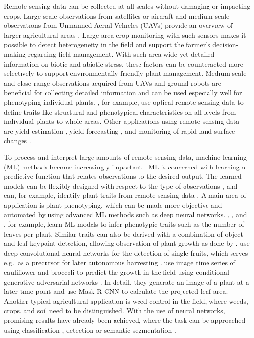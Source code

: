 \documentclass{article}
\begin{document}
Remote sensing data can be collected at all scales without damaging or impacting crops. 
Large-scale observations from satellites or aircraft and medium-scale observations from Unmanned Aerial Vehicles (UAVs) provide an overview of larger agricultural areas \citep{lillesand2015remote}. 
Large-area crop monitoring with such sensors makes it possible to detect heterogeneity in the field and support the farmer's decision-making regarding field management. 
With such area-wide yet detailed information on biotic and abiotic stress, these factors can be counteracted more selectively to support environmentally friendly plant management. 
Medium-scale and close-range observations acquired from UAVs and ground robots are beneficial for collecting detailed information and can be used especially well for phenotyping individual plants.
\cite{nock2016functional}, for example, use optical remote sensing data to define traits like structural and phenotypical characteristics on all levels from individual plants to whole areas.
Other applications using remote sensing data are yield estimation \citep{chaparro2018band}, yield forecasting \citep{mosleh2015application}, and monitoring of rapid land surface changes \citep{verger2014near}.

To process and interpret large amounts of remote sensing data, machine learning (ML) methods become increasingly important \citep{lary2016machine}. 
ML is concerned with learning a predictive function that relates observations to the desired output. The learned models can be flexibly designed with respect to the type of observations \citep{debolini2015changes, reichstein2019deep}, and can, for example, identify plant traits from remote sensing data \citep{ali2015review,verrelst2019quantifying}.
A main area of application is plant phenotyping, which can be made more objective and automated by using advanced ML methods such as deep neural networks.
\cite{romera2016recurrent}, \cite{ren2017end}, and \cite{scharr2016leaf}, for example, learn ML models to infer phenotypic traits such as the number of leaves per plant.
Similar traits can also be derived with a combination of object and leaf keypoint detection, allowing observation of plant growth as done by \cite{weyler2021joint}.
\cite{sa2016deepfruits} use deep convolutional neural networks for the detection of single fruits, which serves e.g.~as a precursor for later autonomous harvesting \citep{arad2020development}.
\cite{drees2021temporal} use image time series of cauliflower and broccoli to predict the growth in the field using conditional generative adversarial networks \citep{isola2017image}. In detail, they generate an image of a plant at a later time point and use Mask R-CNN \citep{he2017mask} to calculate the projected leaf area.
Another typical agricultural application is weed control in the field, where weeds, crops, and soil need to be distinguished. With the use of neural networks, promising results have already been achieved, where the task can be approached using classification \citep{lottes2017effective}, detection \citep{lottes2018fully} or semantic segmentation \citep{milioto2018real,ahmadi2021virtual}.
\end{document}
